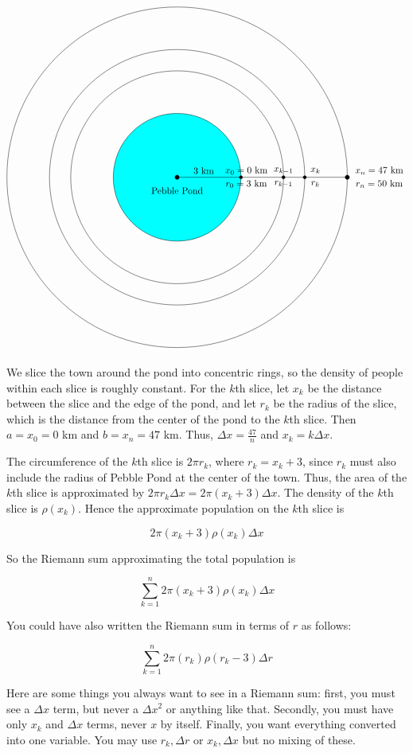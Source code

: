 \documentclass{article}
\begin{document}
\begin{enumerate}
\begin{enumerate}
\begin{solution}

\begin{center}
\[\begin{tikzpicture}
\draw [fill=cyan] (0,0) circle (2.4cm);
\draw (0,0) circle (4cm);

\draw (0,0) circle (4.8cm);
\draw (0,0) circle (6.4cm);
\draw (0,0) -- (6.4,0);

\draw [fill] (0,0) circle [radius=.08];
\node at (0,-.5){Pebble Pond};
\node at (1,0.25) {3 km};
\draw [fill] (2.4,0)circle [radius=.06];
\node at (2.6,.25){$x_0=0$ km};
\node at (2.6,-.25){$r_0=3$ km};
\draw [fill] (4,0)circle [radius=.06];
\node at (4,.25){$x_{k-1}$};
\node at (4,-.25){$r_{k-1}$};
\draw [fill] (4.8,0)circle [radius=.06];
\node at (5.2,.25){$x_k$};
\node at (5.2,-.25){$r_k$};
\draw [fill] (6.4,0) circle [radius=.08];
\node at (7.6,0.25){$x_n = 47$ km};
\node at (7.6,-0.25){$r_n = 50$ km};
\end{tikzpicture}\]
\end{center}

We slice the town around the pond into concentric rings, so the density of people within each slice is roughly constant. For the $k$th slice, let $x_k$ be the distance between the slice and the edge of the pond, and let $r_k$ be the radius of the slice, which is the distance from the center of the pond to the $k$th slice. Then $a=x_0=0$ km and $b=x_n=47$ km. Thus,
$\Delta x = \frac{47}{n}$ and $x_k=k\Delta x$.

The circumference of the $k$th slice is $2 \pi r_k$, where $r_k=x_k+3$, since $r_k$ must also include the radius of Pebble Pond at the center of the town. Thus, the area of the $k$th slice is approximated by $2 \pi r_k \Delta x = 2\pi (x_k+3)\Delta x$. The density of the $k$th slice is $\rho(x_k)$. Hence the approximate population on the $k$th slice is

\[ 2 \pi (x_k+3)  \rho(x_k) \Delta x \]

So the Riemann sum approximating the total population is

\[ \boxed{\sum_{k=1}^n 2 \pi (x_k+3)  \rho(x_k) \Delta x} \]

You could have also written the Riemann sum in terms of $r$ as follows:

$$\boxed{\sum_{k=1}^n 2 \pi (r_k)  \rho(r_k-3) \Delta r} $$

Here are some things you always want to see in a Riemann sum: first, you must see a $\Delta x$ term, but never a $\Delta x^2$ or anything like that. Secondly, you must have only $x_k$ and $\Delta x$ terms, never $x$ by itself. Finally, you want everything converted into one variable. You may use $r_k,\Delta r$ or $x_k, \Delta x$ but no mixing of these.
\end{solution}


\end{enumerate}
\end{enumerate}
\end{document}
